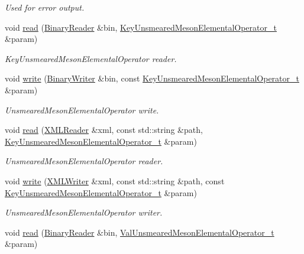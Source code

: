 \begin{DoxyCompactItemize}
\begin{DoxyCompactList}\small\item\em Used for error output. \end{DoxyCompactList}\item 
void \mbox{\hyperlink{namespaceHadron_a1a172c91f55bd8989d9751c7f8b5ac28}{read}} (\mbox{\hyperlink{classADATIO_1_1BinaryReader}{Binary\+Reader}} \&bin, \mbox{\hyperlink{structHadron_1_1KeyUnsmearedMesonElementalOperator__t}{Key\+Unsmeared\+Meson\+Elemental\+Operator\+\_\+t}} \&param)
\begin{DoxyCompactList}\small\item\em Key\+Unsmeared\+Meson\+Elemental\+Operator reader. \end{DoxyCompactList}\item 
void \mbox{\hyperlink{namespaceHadron_ac88cbe3678a2276ee3dd2d55fff0cabf}{write}} (\mbox{\hyperlink{classADATIO_1_1BinaryWriter}{Binary\+Writer}} \&bin, const \mbox{\hyperlink{structHadron_1_1KeyUnsmearedMesonElementalOperator__t}{Key\+Unsmeared\+Meson\+Elemental\+Operator\+\_\+t}} \&param)
\begin{DoxyCompactList}\small\item\em Unsmeared\+Meson\+Elemental\+Operator write. \end{DoxyCompactList}\item 
void \mbox{\hyperlink{namespaceHadron_aa1de9a72a85fa51b9a685a0a2d674b7c}{read}} (\mbox{\hyperlink{classADATXML_1_1XMLReader}{X\+M\+L\+Reader}} \&xml, const std\+::string \&path, \mbox{\hyperlink{structHadron_1_1KeyUnsmearedMesonElementalOperator__t}{Key\+Unsmeared\+Meson\+Elemental\+Operator\+\_\+t}} \&param)
\begin{DoxyCompactList}\small\item\em Unsmeared\+Meson\+Elemental\+Operator reader. \end{DoxyCompactList}\item 
void \mbox{\hyperlink{namespaceHadron_a12ff79f44bd22acfe6be486d4089262e}{write}} (\mbox{\hyperlink{classADATXML_1_1XMLWriter}{X\+M\+L\+Writer}} \&xml, const std\+::string \&path, const \mbox{\hyperlink{structHadron_1_1KeyUnsmearedMesonElementalOperator__t}{Key\+Unsmeared\+Meson\+Elemental\+Operator\+\_\+t}} \&param)
\begin{DoxyCompactList}\small\item\em Unsmeared\+Meson\+Elemental\+Operator writer. \end{DoxyCompactList}\item 
void \mbox{\hyperlink{namespaceHadron_a0dee7d09d7d8dd3947cd5a0c3c4c0447}{read}} (\mbox{\hyperlink{classADATIO_1_1BinaryReader}{Binary\+Reader}} \&bin, \mbox{\hyperlink{structHadron_1_1ValUnsmearedMesonElementalOperator__t}{Val\+Unsmeared\+Meson\+Elemental\+Operator\+\_\+t}} \&param)

\end{DoxyCompactItemize}
